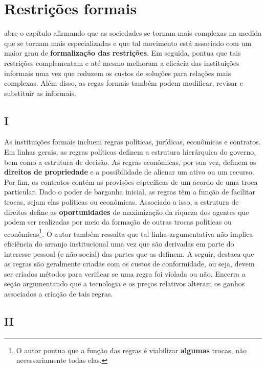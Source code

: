 \section*{Restrições formais}

\autor abre o capítulo afirmando que as sociedades se tornam mais complexas na medida que se tornam mais especializadas e que tal movimento está associado com um maior grau de \textbf{formalização das restrições}. Em seguida, pontua que tais restrições complementam e até mesmo melhoram a eficácia das instituições informais uma vez que reduzem os custos de soluções para relações mais complexas. Além disso, as regas formais também podem modificar, revisar e substituir as informais.

\subsection*{I}

As instituições formais incluem regras políticas, jurídicas, econômicas e contratos. Em linhas gerais, as regras políticas definem a estrutura hierárquica do governo, bem como a estrutura de decisão. As regras econômicas, por sua vez, definem os \textbf{direitos de propriedade} e a possibilidade de alienar um ativo ou um recurso. Por fim, os contratos contém as provisões específicas de um acordo de uma troca particular. Dado o poder de barganha inicial, as regras têm a função de facilitar trocas, sejam elas políticas ou econômicas. Associado a isso, a estrutura de direitos define as \textbf{oportunidades} de maximização da riqueza dos agentes que podem ser realizadas por meio da formação de outras trocas políticas ou econômicas\footnote{O autor pontua que a função das regras é viabilizar \textbf{algumas} trocas, não necessariamente todas elas.}. O autor também ressalta que tal linha argumentativa não implica eficiência do arranjo institucional uma vez que são derivadas em parte do interesse pessoal (e não social) das partes que as definem. A seguir, destaca que as regras são geralmente criadas com os custos de conformidade, ou seja, devem ser criados métodos para verificar se uma regra foi violada ou não. Encerra a seção argumentando que a tecnologia e os preços relativos alteram os ganhos associados a criação de tais regras.

\subsection*{II}

